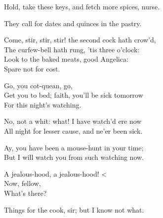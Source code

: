  
\begin{speech}
Hold, take these keys, and fetch more spices, nurse.
\\
\end{speech}
\begin{speech}
They call for dates and quinces in the pastry. 
\\
\end{speech}
\begin{speech}
Come, stir, stir, stir! the second cock hath crow'd,
\\
The curfew-bell hath rung, 'tis three o'clock: \\
Look to the baked meats, good Angelica: \\
Spare not for cost. \\
\end{speech}
\begin{speech}
Go, you cot-quean, go, \\
Get you to bed; faith, you'll be sick tomorrow \\
For this night's watching. \\
\end{speech}
\begin{speech}
No, not a whit: what! I have watch'd ere now \\
All night for lesser cause, and ne'er been sick. \\
\end{speech}
\begin{speech}
Ay, you have been a mouse-hunt in your time; \\

But I will watch you from such watching now. 
\\
\end{speech}
\begin{speech}
A jealous-hood, a jealous-hood! \textless{} \\
Now, fellow, \\
What's there? \\
\end{speech}
\begin{speech}
Things for the cook, sir; but I know not what.
\\
\end{speech}
